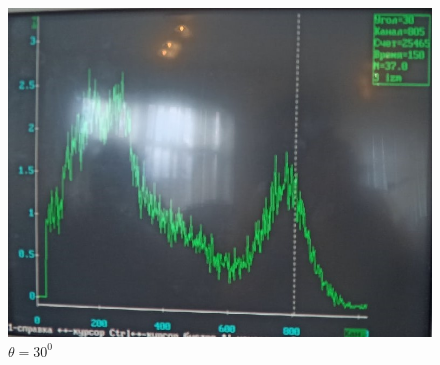 \documentclass[a4paper, 12pt]{article}%
\begin{document}
\begin{figure}[h]
\hfill
\begin{minipage}[h]{0.3\linewidth}
\includegraphics[width = 1\linewidth]{6.jpg}
\caption{$\theta = 30^0$}
\end{minipage}
\end{figure}
\end{document}
